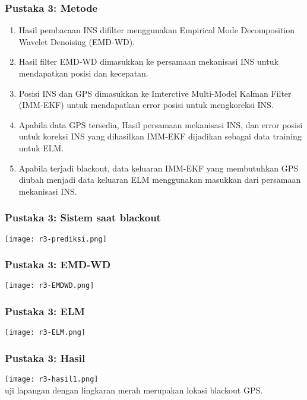 \begin{frame}[allowframebreaks]
    \frametitle{Pustaka 3: Metode}
    \begin{enumerate}
        \justifying
        \item Hasil pembacaan INS difilter menggunakan Empirical Mode Decomposition Wavelet Denoising (EMD-WD).
        \vspace{1em}
        \item Hasil filter EMD-WD dimasukkan ke persamaan mekanisasi INS untuk mendapatkan posisi dan kecepatan.
        \vspace{1em}
        \item Posisi INS dan GPS dimasukkan ke Imterctive Multi-Model Kalman Filter (IMM-EKF) untuk mendapatkan error posisi untuk mengkoreksi INS.
        \vspace{1em}
        \pagebreak
        \item Apabila data GPS tersedia, Hasil persamaan mekanisasi INS, dan error posisi untuk koreksi INS yang dihasilkan IMM-EKF dijadikan sebagai data training untuk ELM.
        \vspace{1em}
        \item Apabila terjadi blackout, data keluaran IMM-EKF yang membutuhkan GPS diubah menjadi data keluaran ELM menggunakan masukkan dari persamaan mekanisasi INS.
    \end{enumerate}
\end{frame}


\begin{frame}
    \frametitle{Pustaka 3: Sistem saat blackout}
    \centering
    \texttt{[image: r3-prediksi.png]}
\end{frame}


\begin{frame}
    \frametitle{Pustaka 3: EMD-WD}
    \centering
    \texttt{[image: r3-EMDWD.png]}
\end{frame}


\begin{frame}
    \frametitle{Pustaka 3: ELM}
    \centering
    \texttt{[image: r3-ELM.png]}
\end{frame}


\begin{frame}
    \frametitle{Pustaka 3: Hasil}
    \centering
    \texttt{[image: r3-hasil1.png]}\\
    uji lapangan dengan lingkaran merah merupakan lokasi blackout GPS.
\end{frame}



